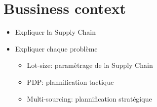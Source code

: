 \chapter{Bussiness context}


\begin{itemize}
  \item Expliquer la Supply Chain
  \item Expliquer chaque problème
  \begin{itemize}
    \item Lot-size: paramètrage de la Supply Chain
    \item PDP: plannification tactique
    \item Multi-sourcing: plannification stratégique
  \end{itemize}
\end{itemize}

